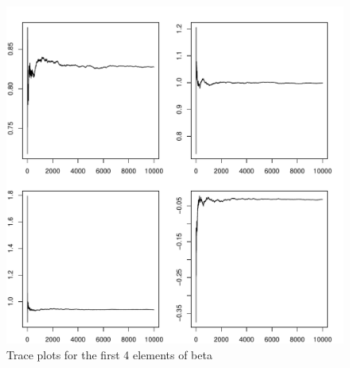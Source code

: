 \documentclass{article}\usepackage[]{graphicx}\usepackage[]{color}
\makeatletter
\def\maxwidth{ %
  \ifdim\Gin@nat@width>\linewidth
    \linewidth
  \else
    \Gin@nat@width
  \fi
}
\newenvironment{knitrout}{}{} %
\makeatother
\begin{document}
\begin{knitrout}
\color{fgcolor}\begin{figure}
\includegraphics[width=\maxwidth]{figure/trace3-1} \caption[Trace plots for the first 4 elements of beta]{Trace plots for the first 4 elements of beta}\label{fig:trace3}
\end{figure}


\end{knitrout}
\end{document}
